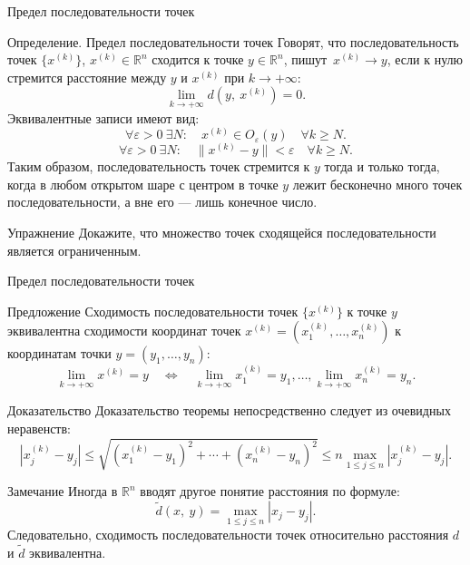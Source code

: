 \documentclass[8pt]{beamer}
\begin{document}
\begin{frame}{Предел последовательности точек}

\begin{block}{Определение. Предел последовательности точек}
Говорят, что последовательность точек $\{x^{(k)}\}$, $x^{(k)}\in\mathbb{R}^n$ сходится к точке $y\in\mathbb{R}^n$, пишут~$x^{(k)}\to y$, если к нулю стремится расстояние между $y$ и $x^{(k)}$ при $k\to+\infty$:
$$\lim_{k\to+\infty} d(y,\ x^{(k)}) = 0.$$
Эквивалентные записи имеют вид:
$$\forall\varepsilon>0\ \exists N:\quad x^{(k)}\in O_\varepsilon(y) \quad \forall k\ge N.$$ 
$$\forall\varepsilon>0\ \exists N:\quad \|x^{(k)} -y\|<\varepsilon \quad \forall k\ge N.$$
Таким образом, последовательность точек стремится к $y$ тогда и только тогда, когда в любом открытом шаре с центром в точке $y$ лежит бесконечно много точек последовательности, а вне его --- лишь конечное число.
\end{block}
\begin{block}{Упражнение}
Докажите, что множество точек сходящейся последовательности является ограниченным.
\end{block}
\end{frame}

\begin{frame}{Предел последовательности точек}

\begin{block}{Предложение}
Сходимость последовательности точек $\{x^{(k)}\}$ к точке $y$ эквивалентна сходимости координат точек $x^{(k)} = ( x_1^{(k)},\ldots,x_n^{(k)})$ к координатам точки $y = (y_1,\ldots,y_n)$:
$$\lim_{k\to+\infty} x^{(k)} = y\quad \iff \quad 
\lim_{k\to+\infty}x_1^{(k)} = y_1,\ldots,\lim_{k\to+\infty}x_n^{(k)} = y_n.$$
\end{block}

\begin{block}{Доказательство}
Доказательство теоремы непосредственно следует из очевидных неравенств:
$$|x_j^{(k)} - y_j|\le \sqrt{(x^{(k)}_1-y_1)^2+\cdots+(x^{(k)}_n-y_n)^2} \le n\max_{1\le j\le n} |x_j^{(k)} - y_j|.$$
\end{block}

\begin{block}{Замечание}
Иногда в $\mathbb{R}^n$ вводят другое понятие расстояния по формуле:
$$\tilde d(x,\ y) = \max_{1\le j\le n} | x_j - y_j |.$$
Следовательно, сходимость последовательности точек относительно расстояния $d$ и $\tilde d$ эквивалентна.
\end{block}
\end{frame}
\end{document}
